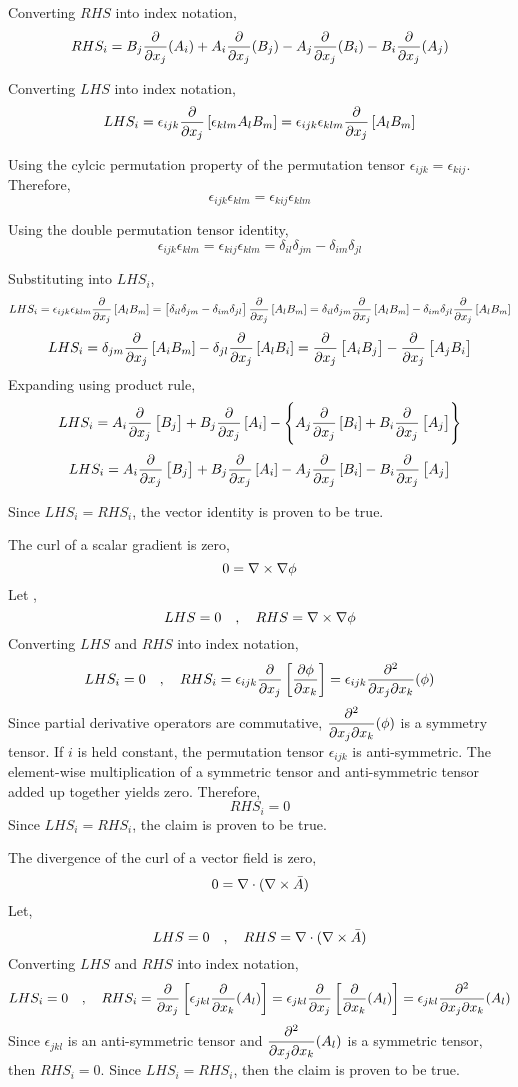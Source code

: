 \documentclass[class=report, 12pt, crop=false]{standalone}
\begin{document}
\begin{center}
Converting $RHS$ into index notation,
$$RHS_i = B_j \frac{\partial }{\partial x_j}(A_i) + A_i \frac{\partial}{\partial x_j}(B_j) - A_j\frac{\partial}{\partial x_j}(B_i) - B_i\frac{\partial}{\partial x_j}(A_j)$$

Converting $LHS$ into index notation,
$$LHS_i = \epsilon_{ijk} \frac{\partial}{\partial x_j}\left[\epsilon_{klm} A_l B_m\right] = \epsilon_{ijk}\epsilon_{klm} \frac{\partial}{\partial x_j}\left[ A_l B_m\right]$$

Using the cylcic permutation property of the permutation tensor $\epsilon_{ijk} = \epsilon_{kij}$. Therefore,
$$\epsilon_{ijk}\epsilon_{klm} = \epsilon_{kij}\epsilon_{klm}$$

Using the double permutation tensor identity,
$$\epsilon_{ijk}\epsilon_{klm} = \epsilon_{kij}\epsilon_{klm} = \delta_{il}\delta_{jm} - \delta_{im}\delta_{jl}$$

Substituting into $LHS_i$,
$$LHS_i = \epsilon_{ijk}\epsilon_{klm} \frac{\partial}{\partial x_j}\left[ A_l B_m\right] = \left[\delta_{il}\delta_{jm} - \delta_{im}\delta_{jl}\right]\frac{\partial}{\partial x_j}\left[ A_l B_m\right] = \delta_{il}\delta_{jm}\frac{\partial}{\partial x_j}\left[ A_l B_m\right] - \delta_{im}\delta_{jl}\frac{\partial}{\partial x_j}\left[ A_l B_m\right]$$
$$LHS_i = \delta_{jm}\frac{\partial}{\partial x_j}\left[ A_i B_m\right] - \delta_{jl}\frac{\partial}{\partial x_j}\left[ A_l B_i\right] = \frac{\partial}{\partial x_j}\left[ A_i B_j\right] - \frac{\partial}{\partial x_j}\left[ A_j B_i\right]$$
Expanding using product rule,
$$LHS_i = A_i\frac{\partial}{\partial x_j}\left[B_j\right] + B_j\frac{\partial}{\partial x_j}\left[A_i\right] - \left\{A_j\frac{\partial}{\partial x_j}\left[B_i\right] + B_i\frac{\partial}{\partial x_j}\left[ A_j\right]\right\}$$
$$LHS_i = A_i\frac{\partial}{\partial x_j}\left[B_j\right] + B_j\frac{\partial}{\partial x_j}\left[A_i\right] - A_j\frac{\partial}{\partial x_j}\left[B_i\right] - B_i\frac{\partial}{\partial x_j}\left[ A_j\right]$$

Since $LHS_i = RHS_i$, the vector identity is proven to be true.


The curl of a scalar gradient is zero,
$$0 = \nabla\times\nabla\phi$$
Let ,
$$LHS = 0 \quad,\quad RHS = \nabla\times\nabla\phi$$
Converting $LHS$ and $RHS$ into index notation,
$$LHS_i = 0 \quad,\quad RHS_i =  \epsilon_{ijk}\frac{\partial}{\partial x_j}\left[\frac{\partial \phi}{\partial x_k}\right] = \epsilon_{ijk}\frac{\partial^2 }{\partial x_j \partial x_k}(\phi)$$
Since partial derivative operators are commutative, $\displaystyle \frac{\partial^2 }{\partial x_j \partial x_k}(\phi)$ is a symmetry tensor. If $i$ is held constant, the permutation tensor $\epsilon_{ijk}$ is anti-symmetric. The element-wise multiplication of a symmetric tensor and anti-symmetric tensor added up together yields zero. Therefore,
$$RHS_i = 0$$
Since $LHS_i = RHS_i$, the claim is proven to be true.


The divergence of the curl of a vector field is zero,
$$0 = \nabla\cdot(\nabla\times \bar{A})$$
Let,
$$LHS = 0 \quad,\quad RHS = \nabla\cdot(\nabla\times \bar{A})$$
Converting $LHS$ and $RHS$ into index notation,
$$LHS_i = 0 \quad,\quad RHS_i = \frac{\partial}{\partial x_j}\left[\epsilon_{jkl} \frac{\partial}{\partial x_k}(A_l)\right] = \epsilon_{jkl}\frac{\partial}{\partial x_j}\left[\frac{\partial}{\partial x_k}(A_l)\right] = \epsilon_{jkl}\frac{\partial^2}{\partial x_j\partial x_k}(A_l)$$
Since $\epsilon_{jkl}$ is an anti-symmetric tensor and $\displaystyle \frac{\partial^2}{\partial x_j\partial x_k}(A_l)$ is a symmetric tensor, then $RHS_i = 0$. Since $LHS_i = RHS_i$, then the claim is proven to be true.




\end{center}
\end{document}
